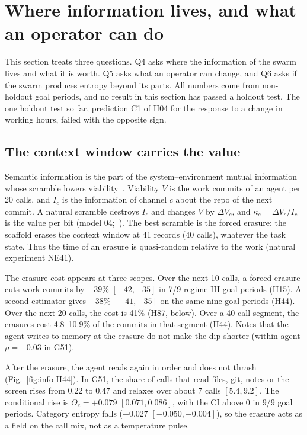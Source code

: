 \section{Where information lives, and what an operator can do}
\label{sec:information}

This section treats three questions.
Q4 asks where the information of the swarm lives and what it is worth.
Q5 asks what an operator can change, and Q6 asks if the swarm produces entropy beyond its parts.
All numbers come from non-holdout goal periods, and no result in this section has passed a holdout test.
The one holdout test so far, prediction C1 of H04 for the response to a change in working hours, failed with the opposite sign.

\subsection{The context window carries the value}
\label{sec:info-context}

Semantic information is the part of the system--environment mutual information whose scramble lowers viability~\cite{in:kolchinsky2018}.
Viability $V$ is the work commits of an agent per 20 calls, and $I_c$ is the information of channel $c$ about the repo of the next commit.
A natural scramble destroys $I_c$ and changes $V$ by $\Delta V_c$, and $\kappa_c=\Delta V_c/I_c$ is the value per bit (model 04;~\cite{in:sowinski2023}).
The best scramble is the forced erasure: the scaffold erases the context window at 41 records (40 calls), whatever the task state.
Thus the time of an erasure is quasi-random relative to the work (natural experiment NE41).

The erasure cost appears at three scopes.
Over the next 10 calls, a forced erasure cuts work commits by $-39\%$ $[-42,-35]$ in 7/9 regime-III goal periods (H15).
A second estimator gives $-38\%$ $[-41,-35]$ on the same nine goal periods (H44).
Over the next 20 calls, the cost is 41\% (H87, below).
Over a 40-call segment, the erasures cost 4.8--10.9\% of the commits in that segment (H44).
Notes that the agent writes to memory at the erasure do not make the dip shorter (within-agent $\rho=-0.03$ in G51).

After the erasure, the agent reads again in order and does not thrash (Fig.~\ref{fig:info-H44}).
In G51, the share of calls that read files, git, notes or the screen rises from 0.22 to 0.47 and relaxes over about 7 calls $[5.4, 9.2]$.
The conditional rise is $\Theta_c=+0.079$ $[0.071, 0.086]$, with the CI above 0 in 9/9 goal periods.
Category entropy falls ($-0.027$ $[-0.050,-0.004]$), so the erasure acts as a field on the call mix, not as a temperature pulse.

